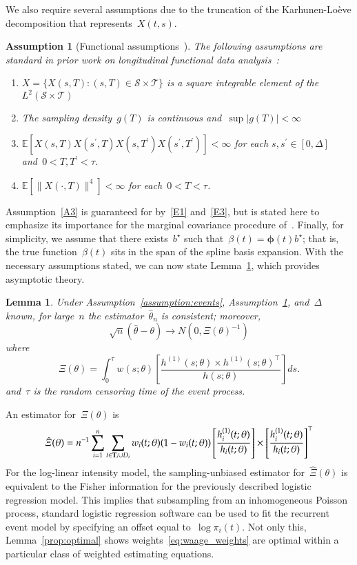 \documentclass[12pt]{amsart}
\def\E{\mathcal{E}}
\newtheorem{lemma}[thm]{Lemma}
\newtheorem{assumption}[thm]{Assumption}
\def\E{\mathbb{E}}
\def\bfT{{\bf T}}
\begin{document}
We also require several assumptions due to the truncation of the
Karhunen-Lo{\`e}ve decomposition that represents~$X(t,s)$.
\begin{assumption}[Functional assumptions~\citep{Park2018}] \normalfont
\label{assumption:truncation}
The following assumptions are standard in prior work on longitudinal
functional data analysis~\citep{Park2018, Yao2005, ChenMuller2012}:
\begin{enumerate}[label=(A.\arabic*)]
\item\label{A1} $X = \{ X(s, T) : (s,T) \in \mathcal{S} \times
  \mathcal{T} \}$ is a square integrable element of the $L^2 (
  \mathcal{S} \times \mathcal{T})$
\item\label{A2} The sampling density~$g(T)$ is continuous
  and~$\sup |g(T)| < \infty$
\item\label{A3} $\E[X(s,T) X(s^\prime, T) X(s,T^\prime)
  X(s^\prime, T^\prime) ] < \infty$ for
  each $s,s^\prime \in [0,\Delta]$ and~$0 < T, T^\prime < \tau$.
\item\label{A4} $\E[\|X(\cdot, T)\|^4] < \infty$ for each~$0< T
  < \tau$.
\end{enumerate}
\end{assumption}
Assumption~\ref{A3} is guaranteed for by~\ref{E1} and~\ref{E3}, but is
stated here to emphasize its importance for the marginal covariance
procedure of~\cite{Park2018}.
Finally, for simplicity, we assume that there exists~$b^\star$
such that~$\beta(t) = \mathbold{\phi} (t) b^\star$; that is, the
true function~$\beta(t)$ sits in the span of the spline basis
expansion. 
With the necessary assumptions stated, we can now state
Lemma~\ref{lemma:simpleasym}, which provides asymptotic theory.
\begin{lemma} \normalfont
\label{lemma:simpleasym}
Under Assumption~\ref{assumption:events},
Assumption~\ref{assumption:truncation}, and~$\Delta$ known, for
large~$n$ the estimator~$\hat \theta_n$ is consistent; moreover,
\[
\sqrt{n} (\hat \theta - \theta) \to N(0, \Xi (\theta)^{-1})
\]
where
\[
  \Xi (\theta) = \int_{0}^{\tau} w(s; \theta) \left[ \frac{h^{(1)}(s;
      \theta) \times  h^{(1)} (s;\theta)^{\top}}{h(s; \theta)} \right]
  ds.
\]
and~$\tau$ is the random censoring time of the event process.
\end{lemma}
An estimator for~$\Xi(\theta)$ is
\begin{equation}
\label{eq:fisher}
  \hat \Xi (\theta) = n^{-1} \sum_{i=1}^n \sum_{t \in \bfT_i \cup D_i} 
  w_i(t;\theta) (1-w_i(t;\theta)) \left[ \frac{h_i^{(1)}(t;
      \theta)}{h_i (t; \theta)} \right] \times  \left [
    \frac{h_i^{(1)} (t;\theta)}{h_i(t; \theta)} \right]^\top
\end{equation}
For the log-linear intensity model, the sampling-unbiased estimator
for~$\hat \Xi(\theta)$ is equivalent to the Fisher information for the
previously described logistic regression model.
This implies that subsampling from an inhomogeneous Poisson process,
standard logistic regression software can be used to fit the recurrent
event model by specifying an offset equal to~$\log \pi_i (t)$.
Not only this, Lemma~\ref{prop:optimal} shows
weights~\eqref{eq:waage_weights} are optimal within a particular class
of weighted estimating equations. 
\end{document}
